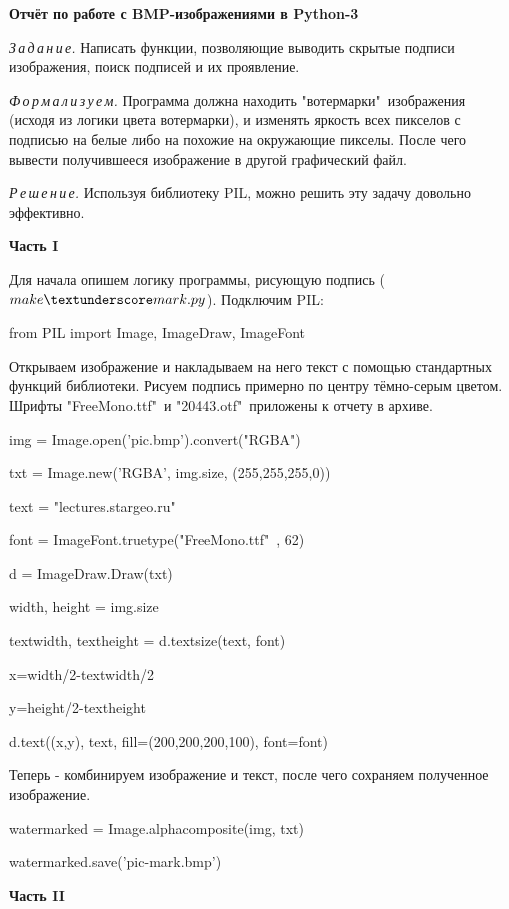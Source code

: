 \documentclass{article}
\begin{document}
\begin{center}


{\Large\bf Отчёт по работе с BMP-изображениями в Python-3}
\end{center}

\textit{З\,а\,д\,а\,н\,и\,е.}  Написать функции, позволяющие выводить скрытые подписи изображения, поиск подписей и их проявление. 

\textit{Ф\,о\,р\,м\,а\,л\,и\,з\,у\,е\,м.} Программа должна находить "вотермарки"\ изображения (исходя из логики цвета вотермарки), и изменять яркость всех пикселов с подписью на белые либо на похожие на окружающие пикселы. После чего вывести получившееся изображение в другой графический файл.
 
\textit{Р\,е\,ш\,е\,н\,и\,е.}  Используя библиотеку PIL, можно решить эту задачу довольно эффективно. 
\begin{center}

{\large\bf Часть I}
\end{center}
 
Для начала опишем логику программы, рисующую подпись ($make\textunderscore mark.py$). Подключим PIL:


\textsf{from PIL import Image, ImageDraw, ImageFont }

Открываем изображение и накладываем на него текст с помощью стандартных функций библиотеки. Рисуем подпись примерно по центру тёмно-серым цветом. Шрифты "FreeMono.ttf"\ и "20443.otf"\  приложены к отчету в архиве. 

{

img = Image.open('pic.bmp').convert("RGBA")

txt = Image.new('RGBA', img.size, (255,255,255,0))

text = "lectures.stargeo.ru"

font = ImageFont.truetype("FreeMono.ttf"\ , 62)

d = ImageDraw.Draw(txt)

width, height = img.size 

textwidth, textheight = d.textsize(text, font)

x=width/2-textwidth/2

y=height/2-textheight

d.text((x,y), text, fill=(200,200,200,100), font=font)
 }


 Теперь - комбинируем изображение и текст, после чего сохраняем полученное изображение.
 
{

watermarked = Image.alpha\textunderscore composite(img, txt)

watermarked.save('pic-mark.bmp')
}
\newpage
\begin{center}
{\large\bf Часть II}
\end{center}
\end{document}
